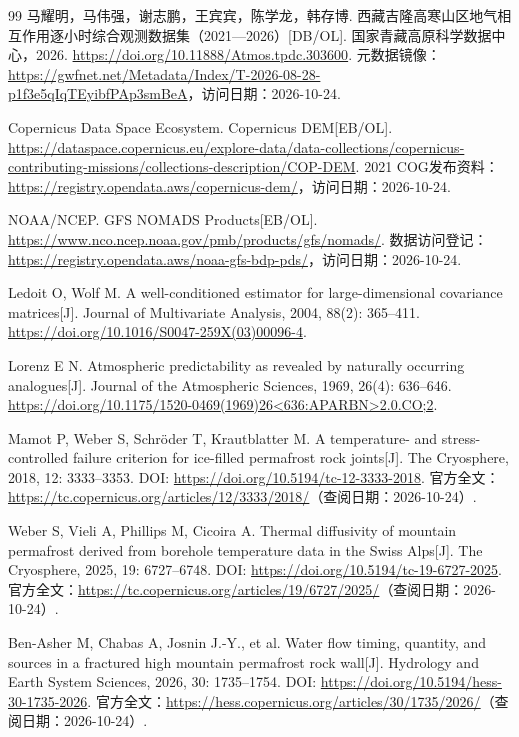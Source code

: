 \begin{thebibliography}{99}
 马耀明，马伟强，谢志鹏，王宾宾，陈学龙，韩存博. 西藏吉隆高寒山区地气相互作用逐小时综合观测数据集（2021—2026）[DB/OL]. 国家青藏高原科学数据中心，2026. \url{https://doi.org/10.11888/Atmos.tpdc.303600}. 元数据镜像：\url{https://gwfnet.net/Metadata/Index/T-2026-08-28-p1f3e5qIqTEyibfPAp3smBeA}，访问日期：2026-10-24.

 Copernicus Data Space Ecosystem. Copernicus DEM[EB/OL]. \url{https://dataspace.copernicus.eu/explore-data/data-collections/copernicus-contributing-missions/collections-description/COP-DEM}. 2021 COG发布资料：\url{https://registry.opendata.aws/copernicus-dem/}，访问日期：2026-10-24.

 NOAA/NCEP. GFS NOMADS Products[EB/OL]. \url{https://www.nco.ncep.noaa.gov/pmb/products/gfs/nomads/}. 数据访问登记：\url{https://registry.opendata.aws/noaa-gfs-bdp-pds/}，访问日期：2026-10-24.

Ledoit O, Wolf M.
A well-conditioned estimator for large-dimensional covariance matrices[J].
Journal of Multivariate Analysis, 2004, 88(2): 365--411.
\url{https://doi.org/10.1016/S0047-259X(03)00096-4}.

Lorenz E N.
Atmospheric predictability as revealed by naturally occurring analogues[J].
Journal of the Atmospheric Sciences, 1969, 26(4): 636--646.
\url{https://doi.org/10.1175/1520-0469(1969)26<636:APARBN>2.0.CO;2}.

Mamot P, Weber S, Schröder T, Krautblatter M.
A temperature- and stress-controlled failure criterion for ice-filled permafrost rock joints[J].
The Cryosphere, 2018, 12: 3333--3353.
DOI: \url{https://doi.org/10.5194/tc-12-3333-2018}.
官方全文：\url{https://tc.copernicus.org/articles/12/3333/2018/}（查阅日期：2026-10-24）.

Weber S, Vieli A, Phillips M, Cicoira A.
Thermal diffusivity of mountain permafrost derived from borehole temperature data in the Swiss Alps[J].
The Cryosphere, 2025, 19: 6727--6748.
DOI: \url{https://doi.org/10.5194/tc-19-6727-2025}.
官方全文：\url{https://tc.copernicus.org/articles/19/6727/2025/}（查阅日期：2026-10-24）.

Ben-Asher M, Chabas A, Josnin J.-Y., et al.
Water flow timing, quantity, and sources in a fractured high mountain permafrost rock wall[J].
Hydrology and Earth System Sciences, 2026, 30: 1735--1754.
DOI: \url{https://doi.org/10.5194/hess-30-1735-2026}.
官方全文：\url{https://hess.copernicus.org/articles/30/1735/2026/}（查阅日期：2026-10-24）.


\end{thebibliography}
